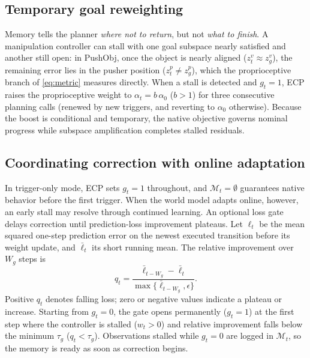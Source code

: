 \subsection{Temporary goal reweighting}
\label{sec:weighting}
Memory tells the planner \emph{where not to return}, but not \emph{what to finish}. A manipulation controller can stall with one goal subspace nearly satisfied and another still open: in PushObj, once the object is nearly aligned ($z_t^v\approx z_g^v$), the remaining error lies in the pusher position ($z_t^p\neq z_g^p$), which the proprioceptive branch of \cref{eq:metric} measures directly. When a stall is detected and $g_t=1$, ECP raises the proprioceptive weight to $\alpha_t=b\,\alpha_0$ ($b>1$) for three consecutive planning calls (renewed by new triggers, and reverting to $\alpha_0$ otherwise). Because the boost is conditional and temporary, the native objective governs nominal progress while subspace amplification completes stalled residuals.

\subsection{Coordinating correction with online adaptation}
\label{sec:gate}
In trigger-only mode, ECP sets $g_t=1$ throughout, and $\mathcal M_t=\emptyset$ guarantees native behavior before the first trigger. When the world model adapts online, however, an early stall may resolve through continued learning. An optional loss gate delays correction until prediction-loss improvement plateaus. Let $\ell_t$ be the mean squared one-step prediction error on the newest executed transition before its weight update, and $\bar\ell_t$ its short running mean. The relative improvement over $W_g$ steps is
\begin{equation}
 q_t=\frac{\bar\ell_{t-W_g}-\bar\ell_t}
 {\max\{\bar\ell_{t-W_g},\epsilon\}}.
 \label{eq:gate}
\end{equation}
Positive $q_t$ denotes falling loss; zero or negative values indicate a plateau or increase. Starting from $g_t=0$, the gate opens permanently ($g_t=1$) at the first step where the controller is stalled ($w_t>0$) and relative improvement falls below the minimum $\tau_g$ ($q_t<\tau_g$). Observations stalled while $g_t=0$ are logged in $\mathcal M_t$, so the memory is ready as soon as correction begins.

